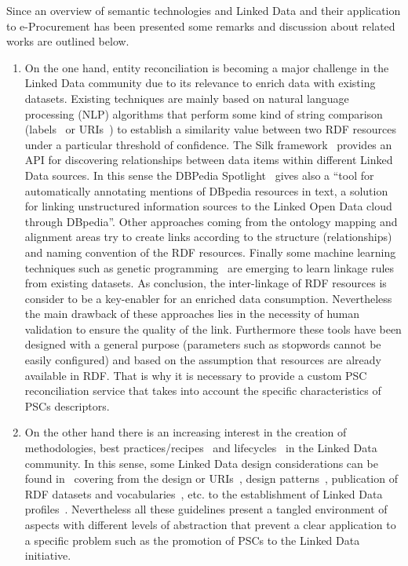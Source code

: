 Since an overview of semantic technologies and Linked Data and their application to e-Procurement has been presented 
some remarks and discussion about related works are outlined below.
 
 \begin{enumerate}
  \item  On the one hand, entity reconciliation is becoming a major challenge in the Linked Data community due to its relevance 
 to enrich data with existing datasets. Existing techniques are mainly based on natural language processing (NLP) algorithms 
 that perform some kind of string comparison (labels~\cite{Serimi} or URIs~\cite{Maali_Cyganiak_2011}) to establish a similarity 
 value between two RDF resources under a particular threshold of confidence. The Silk framework~\cite{DBLP:conf/semweb/JentzschIB10} 
 provides an API for discovering relationships between data items within different Linked Data sources. In this sense 
 the DBPedia Spotlight~\cite{DBLP:conf/i-semantics/MendesJGB11} gives also a ``tool for automatically annotating mentions of DBpedia resources in text,
 a solution for linking unstructured information sources to the Linked Open Data cloud through DBpedia''. Other approaches 
 coming from the ontology mapping and alignment areas try to create links according to the structure (relationships) and naming convention 
 of the RDF resources. Finally some machine learning techniques such as genetic programming~\cite{DBLP:conf/semweb/IseleB11} are emerging 
 to learn linkage rules from existing datasets. As conclusion, the inter-linkage of RDF resources is consider 
 to be a key-enabler for an enriched data consumption. Nevertheless the main drawback of these approaches lies in the necessity of human validation 
 to ensure the quality of the link. Furthermore these tools have been designed with a general purpose (parameters such as stopwords cannot 
 be easily configured) and based on the assumption that resources are already available in RDF. That is why it is necessary 
 to provide a custom PSC reconciliation service that takes into account the specific characteristics of PSCs descriptors.
 
 \item On the other hand there is an increasing interest in the creation of methodologies, 
 best practices/recipes~\cite{best-gld,linked-data-cookbook} and lifecycles~\cite{gld-lifecycle,lod2-stack} in the Linked Data community. 
 In this sense, some Linked Data design considerations can be found in~\cite{bizer07how} covering from the design or URIs~\cite{Sauermann+2007a,bernerslee1998uri,uris-uk}, design patterns~\cite{linked-data-patterns}, 
 publication of RDF datasets and vocabularies~\cite{Berr08}, etc. to the establishment of Linked Data profiles~\cite{basic-profile-w3c}. Nevertheless all these guidelines present 
 a tangled environment of aspects with different levels of abstraction that prevent a clear application to 
 a specific problem such as the promotion of PSCs to the Linked Data initiative.
 

\end{enumerate}
